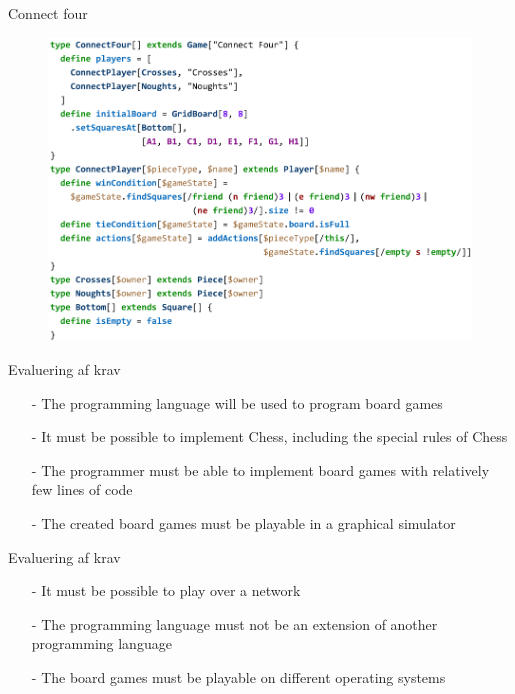 \begin{frame}{Connect four}
 	\begin{figure}
    	\includegraphics[width=0.8\linewidth]{billeder/connect4_codeexample.png}
 	\end{figure}
\end{frame}

\begin{frame}{Evaluering af krav}
	\begin{itemize}
		\item[-] The programming language will be used to program board games
		\item[-] It must be possible to implement Chess, including the special rules of Chess
		\item[-] The programmer must be able to implement board games with relatively few lines of code
		\item[-] The created board games must be playable in a graphical simulator
	\end{itemize}	
\end{frame}

\begin{frame}{Evaluering af krav}
	\begin{itemize}
		\item[-] It must be possible to play over a network
		\item[-] The programming language must not be an extension of another programming language
		\item[-] The board games must be playable on different operating systems
	\end{itemize}	
\end{frame}

